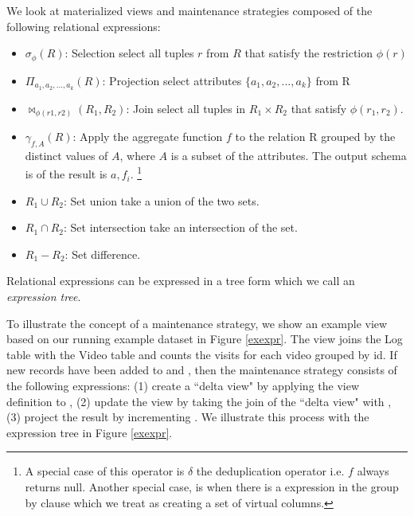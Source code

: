We look at materialized views and maintenance strategies composed of the following relational expressions:
\begin{itemize}[noitemsep]
\item $\sigma_{\phi}(R)$: Selection select all tuples $r$ from $R$ that satisfy the restriction $\phi (r)$ 
\item $\Pi_{a_1,a_2,...,a_k}(R)$: Projection select attributes $\{a_1,a_2,...,a_k\}$ from R
\item $\bowtie_{\phi (r1,r2)}(R_1,R_2)$: Join select all tuples in $R_1 \times R_2$ that satisfy $\phi (r_1,r_2)$.
\item $\gamma_{f,A}(R)$: Apply the aggregate function $f$ to the relation R grouped by the distinct values of $A$, where $A$ is a subset of the attributes. The output schema is of the result is $a, f_i$. \footnote{A special case of this operator is $\delta$ the deduplication operator i.e. $f$ always returns null. Another special case, is when there is a expression in the group by clause which we treat as creating a set of virtual columns.}
\item $R_1 \cup R_2$: Set union take a union of the two sets.
\item $R_1 \cap R_2$: Set intersection take an intersection of the set.
\item $R_1 - R_2$: Set difference.
\end{itemize}
Relational expressions can be expressed in a tree form which we call an \emph{expression tree}.

To illustrate the concept of a maintenance strategy, we show an example view based on our running example dataset in Figure \ref{exexpr}.
The view joins the Log table with the Video table and counts the visits for each video grouped by id.
If new records have been added to  and , then the maintenance strategy consists of the following expressions: (1) create a ``delta view" by applying the view definition to , (2) update the view by taking the join of the ``delta view" with , (3) project the result by incrementing . 
We illustrate this process with the expression tree in Figure \ref{exexpr}.

